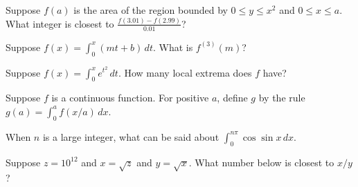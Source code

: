 \documentclass{ximera}
\newcommand{\recommendation}[1]{}
\begin{document}
\begin{shuffle}
\begin{problem}
  Suppose $f(a)$ is the area of the region bounded by $0 \leq y \leq x^2$ and $0 \leq x \leq a$.  What integer is closest to $\frac{f(3.01) - f(2.99)}{0.01}$?
  \begin{multipleChoice}
  \end{multipleChoice}
\end{problem}


\begin{problem}
  Suppose $f(x) = \int_0^x \left( mt + b \right) \, dt$.  What is $f^{(3)}(m)$?
  \begin{multipleChoice}
  \end{multipleChoice}
\end{problem}


\begin{problem}
  Suppose $f(x) = \int_0^x e^{t^2} \, dt$.  How many local extrema does $f$ have?
  \begin{multipleChoice}
  \end{multipleChoice}
\end{problem}

\begin{problem}
  Suppose $f$ is a continuous function.  For positive $a$, define $g$ by the rule $g(a) = \int_0^a f(x/a) \, dx$.
  \begin{multipleChoice}
  \end{multipleChoice}
\end{problem}

\begin{problem}
  When $n$ is a large integer, what can be said about $\int_0^{n \pi} \cos \sin x \, dx$.
  \begin{multipleChoice}
  \end{multipleChoice}
\end{problem}

\begin{problem}
  Suppose $z = 10^{12}$ and $x = \sqrt{z}$ and $y = \sqrt{x}$.  What number below is closest to $x/y$?
  \begin{multipleChoice}
  \end{multipleChoice}
\end{problem}


\end{shuffle}
\end{document}
